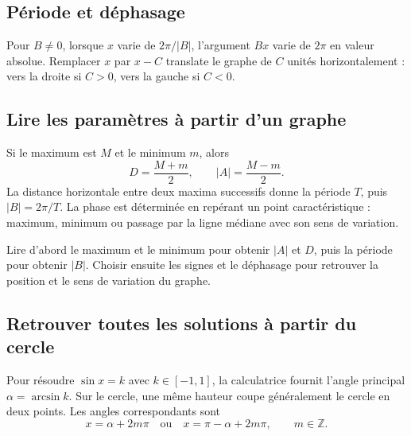 \subsection{Période et déphasage}
Pour $B\ne0$, lorsque $x$ varie de $2\pi/|B|$, l'argument $Bx$ varie de $2\pi$ en valeur absolue. Remplacer $x$ par $x-C$ translate le graphe de $C$ unités horizontalement : vers la droite si $C>0$, vers la gauche si $C<0$.

\begin{center}
\qquad
{}
\end{center}

\subsection{Lire les paramètres à partir d'un graphe}
Si le maximum est $M$ et le minimum $m$, alors
\[
D=\frac{M+m}{2},
\qquad
|A|=\frac{M-m}{2}.
\]
La distance horizontale entre deux maxima successifs donne la période $T$, puis $|B|=2\pi/T$. La phase est déterminée en repérant un point caractéristique : maximum, minimum ou passage par la ligne médiane avec son sens de variation.

\begin{visualbox}
Lire d'abord le maximum et le minimum pour obtenir $|A|$ et $D$, puis la période pour obtenir $|B|$. Choisir ensuite les signes et le déphasage pour retrouver la position et le sens de variation du graphe.
\end{visualbox}



\subsection{Retrouver toutes les solutions à partir du cercle}
Pour résoudre $\sin x=k$ avec $k\in[-1,1]$, la calculatrice fournit l'angle principal $\alpha=\arcsin k$. Sur le cercle, une même hauteur coupe généralement le cercle en deux points. Les angles correspondants sont
\[
x=\alpha+2m\pi
\quad\text{ou}\quad
x=\pi-\alpha+2m\pi,
\qquad m\in\mathbb Z.
\]

